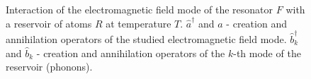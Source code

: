 \begin{figure}
\centering



\caption{Interaction of the electromagnetic field mode of the resonator $F$ with
  a reservoir of atoms $R$ at temperature $T$. $\hat{a}^{\dag}$ and
$\hat{a}$ - creation and annihilation operators of the studied electromagnetic field mode. $\hat{b}_k^{\dag}$ and
$\hat{b}_k$ - creation and annihilation operators of the $k$-th mode of the reservoir (phonons).}
\label{figPart1Ch2_add3}
\end{figure}